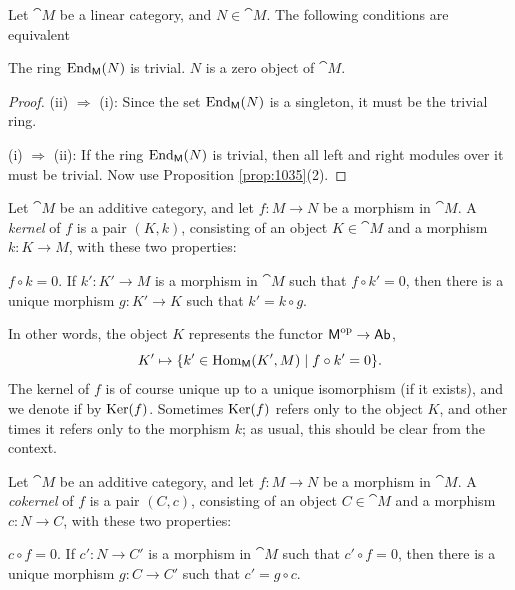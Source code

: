 \begin{prop} \label{prop:1030}
Let $\cat{M}$ be a linear category, and $N \in \cat{M}$. The following 
conditions are equivalent\tup{:}
\begin{enumerate}
 The ring  $\operatorname{End}_{\operatorname{\mathsf{M}}}(N)$ is trivial. 
 $N$ is a zero object of $\cat{M}$.
\end{enumerate}
\end{prop}

\begin{proof} \mbox{}

\smallskip \noindent
(ii) $\Rightarrow$ (i): Since the set $\operatorname{End}_{\operatorname{\mathsf{M}}}(N)$ is a singleton, 
it must be the trivial ring. 

\medskip \noindent 
(i) $\Rightarrow$ (ii): If the ring $\operatorname{End}_{\operatorname{\mathsf{M}}}(N)$ is 
trivial, then all left and right modules over it must be trivial. 
Now use Proposition \ref{prop:1035}(2). 
\end{proof}



 \label{subsec:ab-cats}

\begin{dfn}
Let $\cat{M}$ be an additive category, and let $f : M \to N$ be a morphism in
$\cat{M}$. A {\em kernel} of $f$ is a pair $(K, k)$, consisting of an object
$K \in \cat{M}$ and a morphism $k : K \to M$, with these two properties:
\begin{enumerate}
  $f \circ k = 0$. 
 If $k' : K' \to M$ is a morphism in $\cat{M}$ such that 
$f \circ k' = 0$, then there is a unique morphism $g : K' \to K$ 
such that $k' = k \circ g$.
\end{enumerate}
\end{dfn}

In other words, the object $K$ represents the functor 
$\operatorname{\mathsf{M}}^{\mathrm{op}} \to \operatorname{\mathsf{Ab}}$, 
\[ K' \mapsto \{ k' \in \operatorname{Hom}_{\operatorname{\mathsf{M}}}(K', M) \mid f \circ k' = 0 \} . \]
The kernel of $f$ is of course unique up to a unique isomorphism (if it
exists), and we denote if by $\operatorname{Ker}(f)$. Sometimes $\operatorname{Ker}(f)$ refers
only to the object $K$, and other times it refers only to the morphism
$k$; as usual, this should be clear from the context.

\begin{dfn}
Let $\cat{M}$ be an additive category, and let $f : M \to N$ be a morphism in
$\cat{M}$. A {\em cokernel} of $f$ is a pair $(C, c)$, consisting of an object
$C \in \cat{M}$ and a morphism $c : N \to C$, with these two properties:
\begin{enumerate}
  $c \circ f = 0$. 
 If $c' : N \to C'$ is a morphism in $\cat{M}$ such that 
$c' \circ f = 0$, then there is a unique morphism $g : C \to C'$ 
such that $c' = g \circ c$.
\end{enumerate}
\end{dfn}

